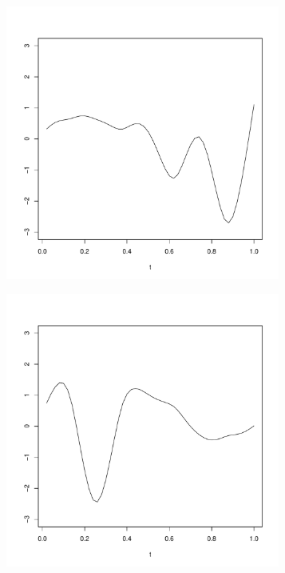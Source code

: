 \begin{figure}
        \begin{subfigure}[b]{0.32\textwidth}
                \centering
                \includegraphics[width=0.99\textwidth]{Images-future-work/ef3.pdf}
                \caption{}
                \label{}
        \end{subfigure}
         \begin{subfigure}[b]{0.32\textwidth}
                \centering
                \includegraphics[width=0.99\textwidth]{Images-future-work/ef4.pdf}

\end{subfigure}
\end{figure}
